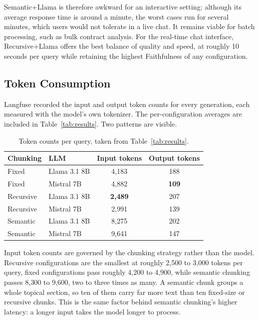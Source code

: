Semantic+Llama is therefore awkward for an interactive setting: although its average response time is around a minute, the worst cases run for several minutes, which users would not tolerate in a live chat. It remains viable for batch processing, such as bulk contract analysis. For the real-time chat interface, Recursive+Llama offers the best balance of quality and speed, at roughly 10 seconds per query while retaining the highest Faithfulness of any configuration.

\subsection{Token Consumption}

Langfuse recorded the input and output token counts for every generation, each measured with the model's own tokenizer. The per-configuration averages are included in Table~\ref{tab:results}. Two patterns are visible.

\begin{table}[ht]
\centering
\begin{tabular}{llcc}
\toprule
\textbf{Chunking} & \textbf{LLM} & \textbf{Input tokens} & \textbf{Output tokens} \\
\midrule
Fixed     & Llama 3.1 8B & 4{,}183 & 188 \\
Fixed     & Mistral 7B   & 4{,}882 & \textbf{109} \\
Recursive & Llama 3.1 8B & \textbf{2{,}489} & 207 \\
Recursive & Mistral 7B   & 2{,}991 & 139 \\
Semantic  & Llama 3.1 8B & 8{,}275 & 202 \\
Semantic  & Mistral 7B   & 9{,}641 & 147 \\
\bottomrule
\end{tabular}
\caption{Token counts per query, taken from Table~\ref{tab:results}.}
\label{tab:excerpt-tokens}
\end{table}

Input token counts are governed by the chunking strategy rather than the model. Recursive configurations are the smallest at roughly 2{,}500 to 3{,}000 tokens per query, fixed configurations pass roughly 4{,}200 to 4{,}900, while semantic chunking passes 8{,}300 to 9{,}600, two to three times as many. A semantic chunk groups a whole topical section, so ten of them carry far more text than ten fixed-size or recursive chunks. This is the same factor behind semantic chunking's higher latency: a longer input takes the model longer to process.

